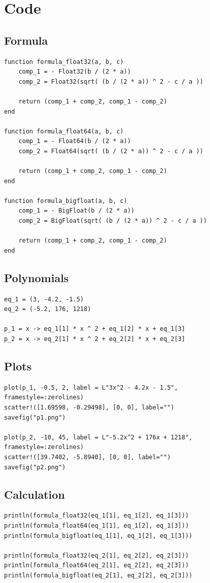 \documentclass[12pt]{article}
\begin{document}
\section{Code}
    \subsection*{Formula}
    \begin{verbatim}
function formula_float32(a, b, c)
    comp_1 = - Float32(b / (2 * a))
    comp_2 = Float32(sqrt( (b / (2 * a)) ^ 2 - c / a ))

    return (comp_1 + comp_2, comp_1 - comp_2)
end

function formula_float64(a, b, c)
    comp_1 = - Float64(b / (2 * a))
    comp_2 = Float64(sqrt( (b / (2 * a)) ^ 2 - c / a ))

    return (comp_1 + comp_2, comp_1 - comp_2)
end

function formula_bigfloat(a, b, c)
    comp_1 = - BigFloat(b / (2 * a))
    comp_2 = BigFloat(sqrt( (b / (2 * a)) ^ 2 - c / a ))

    return (comp_1 + comp_2, comp_1 - comp_2)
end
    \end{verbatim}

    \subsection*{Polynomials}
    \begin{verbatim}
eq_1 = (3, -4.2, -1.5)
eq_2 = (-5.2, 176, 1218)

p_1 = x -> eq_1[1] * x ^ 2 + eq_1[2] * x + eq_1[3]
p_2 = x -> eq_2[1] * x ^ 2 + eq_2[2] * x + eq_2[3]
    \end{verbatim}

    \subsection*{Plots}
    \begin{verbatim}
plot(p_1, -0.5, 2, label = L"3x^2 - 4.2x - 1.5", framestyle=:zerolines)
scatter!([1.69598, -0.29498], [0, 0], label="")
savefig("p1.png")

plot(p_2, -10, 45, label = L"-5.2x^2 + 176x + 1218", framestyle=:zerolines)
scatter!([39.7402, -5.8940], [0, 0], label="")
savefig("p2.png")
    \end{verbatim}

    \subsection*{Calculation}
\begin{verbatim}
println(formula_float32(eq_1[1], eq_1[2], eq_1[3]))
println(formula_float64(eq_1[1], eq_1[2], eq_1[3]))
println(formula_bigfloat(eq_1[1], eq_1[2], eq_1[3]))

println(formula_float32(eq_2[1], eq_2[2], eq_2[3]))
println(formula_float64(eq_2[1], eq_2[2], eq_2[3]))
println(formula_bigfloat(eq_2[1], eq_2[2], eq_2[3]))
\end{verbatim}
\end{document}

